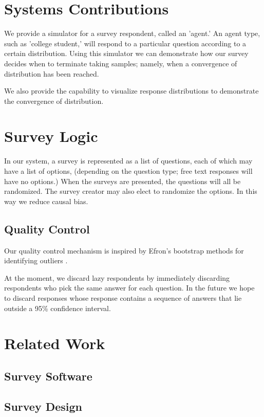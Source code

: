 \documentclass{article}
\begin{document}
\section{Systems Contributions}
We provide a simulator for a survey respondent, called an 'agent.' An agent type, such as 'college student,' will respond to a particular question according to a certain distribution. Using this simulator we can demonstrate how our survey decides when to terminate taking samples; namely, when a convergence of distribution has been reached. %

We also provide the capability to visualize response distributions to demonstrate the convergence of distribution.

\section{Survey Logic}
In our system, a survey is represented as a list of questions, each of which may have a list of options, (depending on the question type; free text responses will have no options.) When the surveys are presented, the questions will all be randomized. The survey creator may also elect to randomize the options. In this way we reduce causal bias.
	

\subsection{Quality Control}
Our quality control mechanism is inspired by Efron's bootstrap methods for identifying outliers \cite{bootstrap}.

At the moment, we discard lazy respondents by immediately discarding respondents who pick the same answer for each question. In the future we hope to discard responses whose response contains a sequence of answers that lie outside a 95\% confidence interval. %
\section{Related Work}
\subsection{Survey Software}
\subsection{Survey Design}
\end{document}
